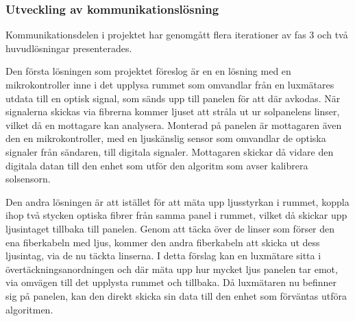         \subsubsection{Utveckling av kommunikationslösning} %
        \label{ssub:utformning_av_kommunikationslosning}
            Kommunikationsdelen i projektet har genomgått flera iterationer av fas 3 och två huvudlösningar presenterades.\bigskip 

            Den första lösningen som projektet föreslog är en en lösning med en mikrokontroller inne i det upplysa rummet som omvandlar från en luxmätares utdata till en optisk signal, som sänds upp till panelen  för att där avkodas. När signalerna skickas via fibrerna kommer ljuset att stråla ut ur solpanelens linser, vilket då en mottagare kan analysera. Monterad på panelen är mottagaren även den en mikrokontroller, med en ljuskänslig sensor som omvandlar de optiska signaler från sändaren, till digitala signaler. Mottagaren skickar då vidare den digitala datan till den enhet som utför den algoritm som avser kalibrera solsensorn. \bigskip

            Den andra lösningen är att istället för att mäta upp ljusstyrkan i rummet, koppla ihop två stycken optiska fibrer från samma panel i rummet, vilket då skickar upp ljusintaget tillbaka till panelen. Genom att täcka över de linser som förser den ena fiberkabeln med ljus, kommer den andra fiberkabeln att skicka ut dess ljusintag, via de nu täckta linserna. I detta förslag kan en luxmätare sitta i övertäckningsanordningen och där mäta upp hur mycket ljus panelen tar emot, via omvägen till det upplysta rummet och tillbaka. Då luxmätaren nu befinner sig på panelen, kan den direkt skicka sin data till den enhet som förväntas utföra algoritmen. %

